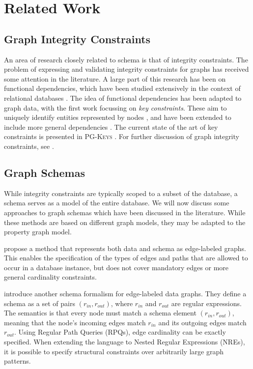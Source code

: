 \documentclass{report}
\theoremstyle{definition}
\begin{document}
\chapter{Related Work}
\label{ch:related-work}

\section{Graph Integrity Constraints}

An area of research closely related to schema is that of integrity constraints. The problem of expressing and validating integrity constraints for graphs has received some attention in the literature. A large part of this research has been on functional dependencies, which have been studied extensively in the context of relational databases \citep{fagin1984theory,abiteboul1999data}. The idea of functional dependencies has been adapted to graph data, with the first work focussing on \emph{key constraints}. These aim to uniquely identify entities represented by nodes \citep{fan2015keys}, and have been extended to include more general dependencies \citep{fan2016functional}. The current state of the art of key constraints is presented in \textsc{PG-Keys} \citep{angles2021keys}. For further discussion of graph integrity constraints, see \citet{bonifati2018querying}.

\section{Graph Schemas}

While integrity constraints are typically scoped to a subset of the database, a schema serves as a model of the entire database. We will now discuss some approaches to graph schemas which have been discussed in the literature. While these methods are based on different graph models, they may be adapted to the property graph model.

\citet{buneman1997adding} propose a method that represents both data and schema as edge-labeled graphs. This enables the specification of the types of edges and paths that are allowed to occur in a database instance, but does not cover mandatory edges or more general cardinality constraints.

\citet{colazzo2015typing} introduce another schema formalism for edge-labeled data graphs. They define a schema as a set of pairs $(r_{in}, r_{out})$, where $r_{in}$ and $r_{out}$ are regular expressions. The semantics is that every node must match a schema element $(r_{in}, r_{out})$, meaning that the node's incoming edges match $r_{in}$ and its outgoing edges match $r_{out}$. Using Regular Path Queries (RPQs), edge cardinality can be exactly specified. When extending the language to Nested Regular Expressions (NREs), it is possible to specify structural constraints over arbitrarily large graph patterns.
\end{document}
